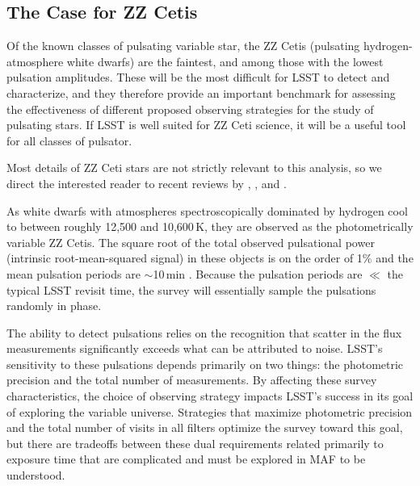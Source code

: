 \subsection{The Case for ZZ Cetis}
\label{sec:\secname:targets}

Of the known classes of pulsating variable star, the ZZ Cetis
(pulsating hydrogen-atmosphere white dwarfs) are the faintest, and among
those with the lowest pulsation amplitudes.  These will be the most
difficult for LSST to detect and characterize, and they therefore
provide an important benchmark for assessing the effectiveness of
different proposed observing strategies for the study of pulsating
stars.  If LSST is well suited for ZZ Ceti science, it will be a useful
tool for all classes of pulsator.

Most details of ZZ Ceti stars are not strictly relevant to this
analysis, so we direct the interested reader to recent reviews by
\citet{2008ARA&A..46..157W}, \citet{2008PASP..120.1043F}, and
\citet{2010A&ARv..18..471A}.

As white dwarfs with atmospheres spectroscopically dominated by hydrogen
cool to between roughly 12,500 and 10,600\,K, they are observed as the
photometrically variable ZZ Cetis.  The square root of the total
observed pulsational power (intrinsic root-mean-squared signal) in these
objects is on the order of 1\% and the mean pulsation periods are
$\sim$10\,min \citep[e.g.,][]{2006ApJ...640..956M}.  Because the pulsation
periods are $\ll$ the typical LSST revisit time, the survey will essentially
sample the pulsations randomly in phase.

The ability to detect pulsations relies on the recognition that scatter
in the flux measurements significantly exceeds what can be attributed to
noise.  LSST's sensitivity to these pulsations depends primarily on two things:
the photometric precision and the total number of measurements.  By
affecting these survey characteristics, the choice of observing strategy
impacts LSST's success in its goal of exploring the variable universe.
Strategies that maximize photometric precision and the total number of
visits in all filters optimize the survey toward this goal, but there are
tradeoffs between these dual requirements related primarily to exposure
time that are complicated and must be explored in MAF to be understood.

